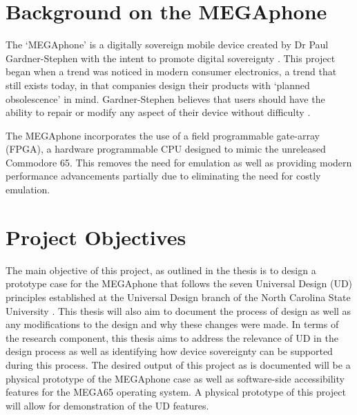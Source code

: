 
\section{Background on the MEGAphone}

The ‘MEGAphone’ is a digitally sovereign mobile device created by Dr Paul Gardner-Stephen with the intent to promote digital sovereignty \cite{mega65}.
This project began when a trend was noticed in modern consumer electronics, a trend that still exists today, in that companies design their products with ‘planned obsolescence’ in mind. 
Gardner-Stephen believes that users should have the ability to repair or modify any aspect of their device without difficulty \cite{mobilehistory}.

The MEGAphone incorporates the use of a field programmable gate-array (FPGA), a hardware programmable CPU designed to mimic the unreleased Commodore 65. 
This removes the need for emulation as well as providing modern performance advancements partially due to eliminating the need for costly emulation.



\section{Project Objectives}

The main objective of this project, as outlined in the thesis is to design a prototype case for the MEGAphone that follows the seven Universal Design (UD) principles established at the Universal Design branch of the North Carolina State University \cite{sevenprinciples}. 
This thesis will also aim to document the process of design as well as any modifications to the design and why these changes were made. 
In terms of the research component, this thesis aims to address the relevance of UD in the design process as well as identifying how device sovereignty can be supported during this process. 
The desired output of this project as is documented will be a physical prototype of the MEGAphone case as well as software-side accessibility features for the MEGA65 operating system. 
A physical prototype of this project will allow for demonstration of the UD features.
 
